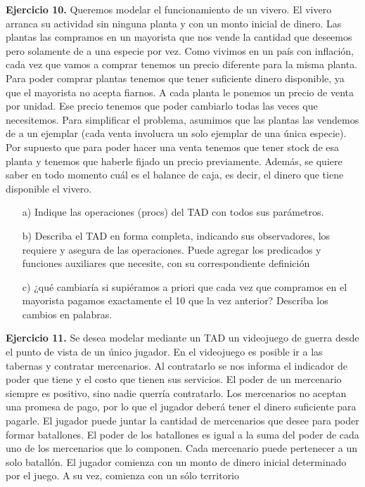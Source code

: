\documentclass{article}
\begin{document}
\textbf{Ejercicio 10.} Queremos modelar el funcionamiento de un vivero. El vivero arranca su actividad sin ninguna planta y con
un monto inicial de dinero. Las plantas las compramos en un mayorista que nos vende la cantidad que deseemos pero solamente de a una especie por vez. Como vivimos en un pa\'is con inflaci\'on, cada vez que vamos a comprar tenemos un precio diferente para la misma planta. Para poder comprar plantas tenemos que tener suficiente dinero disponible, ya que el mayorista no acepta fiarnos. A cada planta le ponemos un precio de venta por unidad. Ese precio tenemos que poder cambiarlo todas las veces que necesitemos. Para simplificar el problema, asumimos que las plantas las vendemos de a un ejemplar (cada venta involucra un solo ejemplar de una \'unica especie). Por supuesto que para poder hacer una venta tenemos que tener stock de esa planta y tenemos que haberle fijado un precio previamente. Adem\'as, se quiere saber en todo momento cu\'al es el balance de caja, es decir, el dinero que tiene disponible el vivero.
\begin{itemize}
    \item[a)] Indique las operaciones (procs) del TAD con todos sus par\'ametros.
    \item[b)] Describa el TAD en forma completa, indicando sus observadores, los requiere y asegura de las operaciones. Puede agregar
    los predicados y funciones auxiliares que necesite, con su correspondiente definici\'on
    \item[c)] ¿qu\'e cambiar\'ia si supi\'eramos a priori que cada vez que compramos en el mayorista pagamos exactamente el 10 %
    que la vez anterior? Describa los cambios en palabras.
\end{itemize}
\textbf{Ejercicio 11.} Se desea modelar mediante un TAD un videojuego de guerra desde el punto de vista de un \'unico jugador.
En el videojuego es posible ir a las tabernas y contratar mercenarios. Al contratarlo se nos informa el indicador de poder
que tiene y el costo que tienen sus servicios. El poder de un mercenario siempre es positivo, sino nadie querr\'ia contratarlo.
Los mercenarios no aceptan una promesa de pago, por lo que el jugador deber\'a tener el dinero suficiente para pagarle. El
jugador puede juntar la cantidad de mercenarios que desee para poder formar batallones. El poder de los batallones es igual
a la suma del poder de cada uno de los mercenarios que lo componen. Cada mercenario puede pertenecer a un solo batall\'on.
El jugador comienza con un monto de dinero inicial determinado por el juego. A su vez, comienza con un s\'olo territorio
\end{document}
